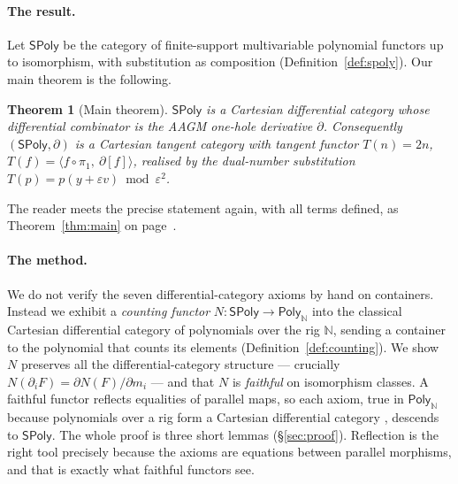 \documentclass[11pt]{article}
\newtheorem{theorem}{Theorem}
\theoremstyle{definition}
\newcommand{\SPoly}{\mathsf{SPoly}}
\newcommand{\PolyN}{\mathsf{Poly}_{\mathbb{N}}}
\newcommand{\N}{\mathbb{N}}
\begin{document}
\paragraph{The result.}
Let $\SPoly$ be the category of finite-support multivariable polynomial functors up to isomorphism,
with substitution as composition (Definition~\ref{def:spoly}). Our main theorem is the following.

\begin{theorem}[Main theorem]\label{thm:main-intro}
$\SPoly$ is a Cartesian differential category whose differential combinator is the AAGM one-hole
derivative $\partial$. Consequently $(\SPoly,\partial)$ is a Cartesian tangent category with
tangent functor $T(n)=2n$, $T(f)=\langle f\circ\pi_1,\ \partial[f]\rangle$, realised by the
dual-number substitution $T(p)=p(y+\varepsilon v)\bmod\varepsilon^2$.
\end{theorem}

The reader meets the precise statement again, with all terms defined, as
Theorem~\ref{thm:main} on page~\pageref{thm:main}.

\paragraph{The method.}
We do not verify the seven differential-category axioms by hand on containers. Instead we exhibit
a \emph{counting functor} $N\colon\SPoly\to\PolyN$ into the classical Cartesian differential
category of polynomials over the rig $\N$, sending a container to the polynomial that counts its
elements (Definition~\ref{def:counting}). We show $N$ preserves all the differential-category
structure --- crucially $N(\partial_iF)=\partial N(F)/\partial m_i$ --- and that $N$ is
\emph{faithful} on isomorphism classes. A faithful functor reflects equalities of parallel maps,
so each axiom, true in $\PolyN$ because polynomials over a rig form a Cartesian differential
category \cite{BCS2009}, descends to $\SPoly$. The whole proof is three short lemmas
(\S\ref{sec:proof}). Reflection is the right tool precisely because the axioms are equations
between parallel morphisms, and that is exactly what faithful functors see.
\end{document}
